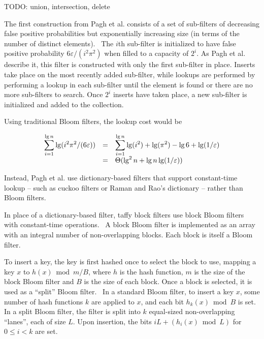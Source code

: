\documentclass[sigconf, nonacm]{acmart}
\begin{document}
TODO: union, intersection, delete

The first construction from Pagh et al. consists of a set of sub-filters of decreasing false positive probabilities but exponentially increasing size (in terms of the number of distinct elements).~\cite{psw}
The $i$th sub-filter is initialized to have false positive probability $6 \varepsilon/(i^2 \pi^2)$ when filled to a capacity of $2^i$.
As Pagh et al. describe it, this filter is constructed with only the first sub-filter in place.
Inserts take place on the most recently added sub-filter, while lookups are performed by performing a lookup in each sub-filter until the element is found or there are no more sub-filters to search.
Once $2^i$ inserts have taken place, a new sub-filter is initialized and added to the collection.

Using traditional Bloom filters, the lookup cost would be

\[
\begin{array}{r c l}
\displaystyle\sum_{i=1}^{\lg n} \lg (i^2 \pi^2 /(6 \varepsilon)) & = &
 \displaystyle\sum_{i=1}^{\lg n} \lg (i^2) + \lg( \pi^2) - \lg 6 + \lg (1/\varepsilon) \\
& = & \Theta(\lg^2 n + \lg n \lg (1/\varepsilon))
\end{array}
\]

Instead, Pagh et al. use dictionary-based filters that support constant-time lookup -- such as cuckoo filters or Raman and Rao's dictionary -- rather than Bloom filters.~\cite{succinct,psw}

In place of a dictionary-based filter, taffy block filters use block Bloom filters with constant-time operations.~\cite{block-bloom,ultra-fast,cuckoo-filter-github}
A block Bloom filter is implemented as an array with an integral number of non-overlapping blocks.
Each block is itself a Bloom filter.

To insert a key, the key is first hashed once to select the block to use, mapping a key $x$ to $h(x) \bmod m/B$, where $h$ is the hash function, $m$ is the size of the block Bloom filter and $B$ is the size of each block.
Once a block is selected, it is used as a ``split'' Bloom filter.~\cite{split-bloom}
In a standard Bloom filter, to insert a key $x$, some number of hash functions $k$ are applied to $x$, and each bit $h_k(x) \bmod B$ is set.
In a split Bloom filter, the filter is split into $k$ equal-sized non-overlapping ``lanes'', each of size $L$.
Upon insertion, the bits $i L + (h_i(x) \bmod L)$ for $0 \le i < k$ are set.
\end{document}
